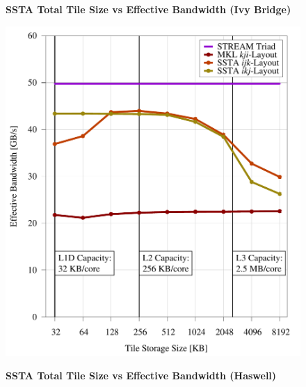 \documentclass{sig-alternate-05-2015}
\begin{document}
\begin{figure}[!bth]
  \captionsetup{width=0.39\textwidth}
  \centering
  \begin{minipage}{0.49\textwidth}
    \centering
    \label{fig:results:tile_size_ivb}
    \caption{
      \textbf{SSTA Total Tile Size vs Effective Bandwidth (Ivy Bridge)}
    }
    \includegraphics[width=0.99\columnwidth]{figures/post_tsb_tw_sweep_full_matrix_double_precision_production_edison_ivb_e5_2695_v2_08_31_2016_09_03_2016_12pus.pdf}
  \end{minipage}
  \begin{minipage}{0.49\textwidth}
    \centering
    \label{fig:results:tile_size_hsw}
    \caption{
      \textbf{SSTA Total Tile Size vs Effective Bandwidth (Haswell)}
    }

\end{minipage}
\end{figure}
\end{document}
